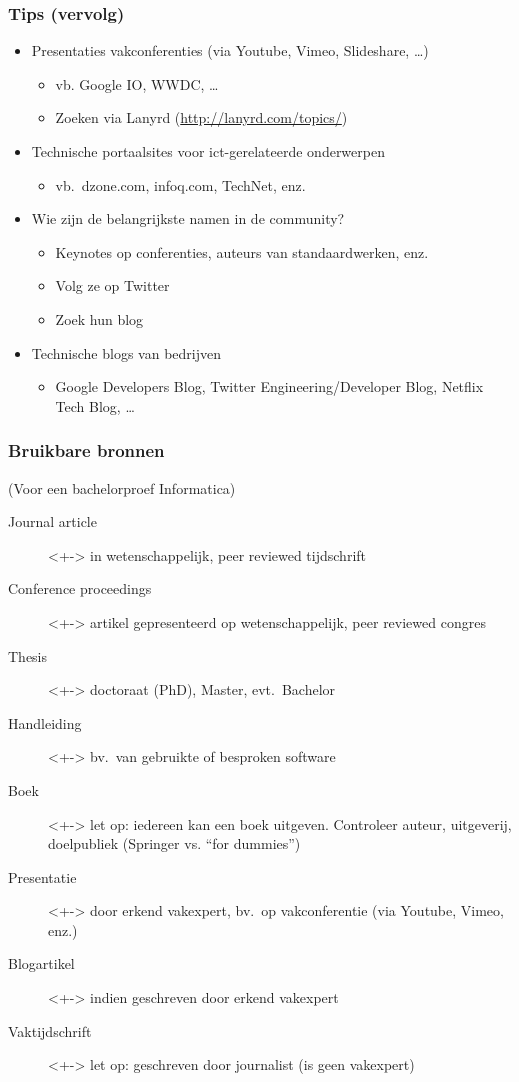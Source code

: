 \documentclass{beamer}
\begin{document}
\begin{frame}
  \frametitle{Tips (vervolg)}

  \begin{itemize}
    \item Presentaties vakconferenties (via Youtube, Vimeo, Slideshare, \dots)
      \begin{itemize}
        \item vb. Google IO, WWDC, \dots
        \item Zoeken via Lanyrd (\url{http://lanyrd.com/topics/})
      \end{itemize}
    \item<+-> Technische portaalsites voor ict-gerelateerde onderwerpen
      \begin{itemize}
        \item vb.~dzone.com, infoq.com, TechNet, enz.
      \end{itemize}
    \item<+-> Wie zijn de belangrijkste namen in de community?
      \begin{itemize}
        \item Keynotes op conferenties, auteurs van standaardwerken, enz.
        \item Volg ze op Twitter
        \item Zoek hun blog
      \end{itemize}
    \item<+-> Technische blogs van bedrijven
      \begin{itemize}
        \item Google Developers Blog, Twitter Engineering/Developer Blog, Netflix Tech Blog, \dots
      \end{itemize}
  \end{itemize}
\end{frame}


\begin{frame}
  \frametitle{Bruikbare bronnen}

  (Voor een bachelorproef Informatica)

  \begin{description}
    \item[Journal article]<+-> in wetenschappelijk, peer reviewed tijdschrift
    \item[Conference proceedings]<+-> artikel gepresenteerd op wetenschappelijk, peer reviewed congres
    \item[Thesis]<+-> doctoraat (PhD), Master, evt.~Bachelor
    \item[Handleiding]<+-> bv.~van gebruikte of besproken software
    \item[Boek]<+-> let op: iedereen kan een boek uitgeven. Controleer auteur, uitgeverij, doelpubliek (Springer vs. ``for dummies'')
    \item[Presentatie]<+-> door erkend vakexpert, bv.~op vakconferentie (via Youtube, Vimeo, enz.)
    \item[Blogartikel]<+-> indien geschreven door erkend vakexpert
    \item[Vaktijdschrift]<+-> let op: geschreven door journalist (is geen vakexpert)
  \end{description}
\end{frame}
\end{document}
